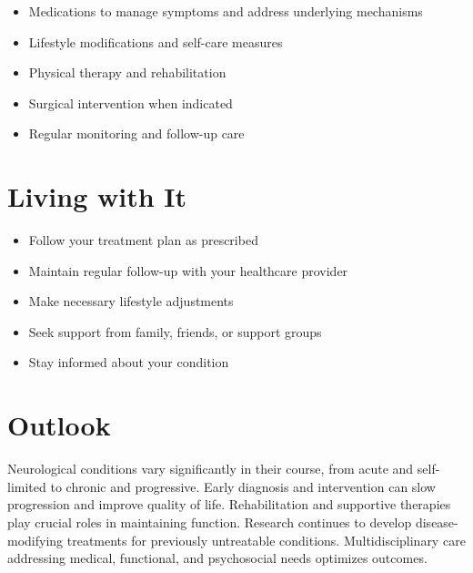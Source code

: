 \begin{itemize}[noitemsep]
  \item Medications to manage symptoms and address underlying mechanisms
  \item Lifestyle modifications and self-care measures
  \item Physical therapy and rehabilitation
  \item Surgical intervention when indicated
  \item Regular monitoring and follow-up care
\end{itemize}
\section{Living with It}
\begin{itemize}[noitemsep]
  \item Follow your treatment plan as prescribed
  \item Maintain regular follow-up with your healthcare provider
  \item Make necessary lifestyle adjustments
  \item Seek support from family, friends, or support groups
  \item Stay informed about your condition
\end{itemize}
\section{Outlook}
Neurological conditions vary significantly in their course, from acute and self-limited to chronic and progressive. Early diagnosis and intervention can slow progression and improve quality of life. Rehabilitation and supportive therapies play crucial roles in maintaining function. Research continues to develop disease-modifying treatments for previously untreatable conditions. Multidisciplinary care addressing medical, functional, and psychosocial needs optimizes outcomes.
